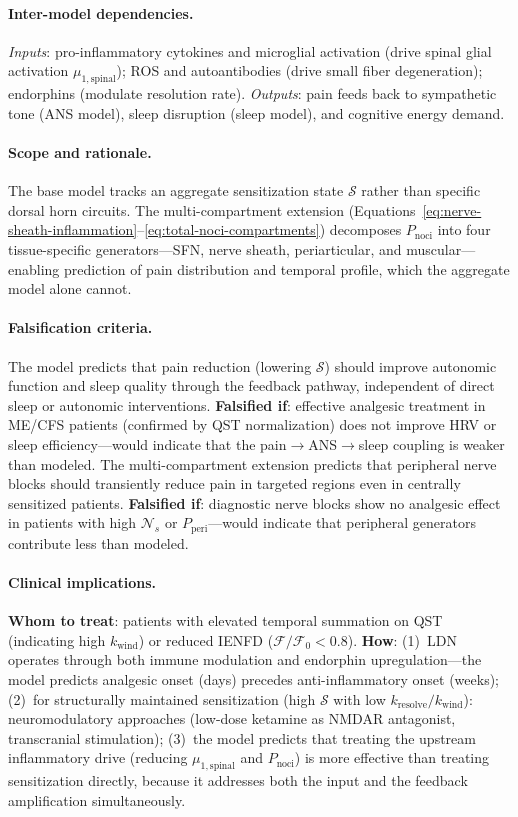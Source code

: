 \paragraph{Inter-model dependencies.}
\emph{Inputs}: pro-inflammatory cytokines and microglial activation (drive spinal glial activation $\mu_{1,\text{spinal}}$); ROS and autoantibodies (drive small fiber degeneration); endorphins (modulate resolution rate). \emph{Outputs}: pain feeds back to sympathetic tone (ANS model), sleep disruption (sleep model), and cognitive energy demand.

\paragraph{Scope and rationale.}
The base model tracks an aggregate sensitization state $\mathcal{S}$ rather than specific dorsal horn circuits. The multi-compartment extension (Equations~\ref{eq:nerve-sheath-inflammation}--\ref{eq:total-noci-compartments}) decomposes $P_{\text{noci}}$ into four tissue-specific generators---SFN, nerve sheath, periarticular, and muscular---enabling prediction of pain distribution and temporal profile, which the aggregate model alone cannot.

\paragraph{Falsification criteria.}
The model predicts that pain reduction (lowering $\mathcal{S}$) should improve autonomic function and sleep quality through the feedback pathway, independent of direct sleep or autonomic interventions. \textbf{Falsified if}: effective analgesic treatment in ME/CFS patients (confirmed by QST normalization) does not improve HRV or sleep efficiency---would indicate that the pain$\to$ANS$\to$sleep coupling is weaker than modeled. The multi-compartment extension predicts that peripheral nerve blocks should transiently reduce pain in targeted regions even in centrally sensitized patients. \textbf{Falsified if}: diagnostic nerve blocks show no analgesic effect in patients with high $\mathcal{N}_s$ or $P_{\text{peri}}$---would indicate that peripheral generators contribute less than modeled.

\paragraph{Clinical implications.}
\textbf{Whom to treat}: patients with elevated temporal summation on QST (indicating high $k_{\text{wind}}$) or reduced IENFD ($\mathcal{F}/\mathcal{F}_0 < 0.8$). \textbf{How}: (1)~LDN operates through both immune modulation and endorphin upregulation---the model predicts analgesic onset (days) precedes anti-inflammatory onset (weeks); (2)~for structurally maintained sensitization (high $\mathcal{S}$ with low $k_{\text{resolve}}/k_{\text{wind}}$): neuromodulatory approaches (low-dose ketamine as NMDAR antagonist, transcranial stimulation); (3)~the model predicts that treating the upstream inflammatory drive (reducing $\mu_{1,\text{spinal}}$ and $P_{\text{noci}}$) is more effective than treating sensitization directly, because it addresses both the input and the feedback amplification simultaneously.


